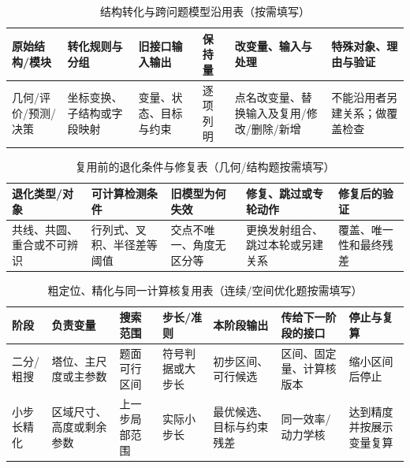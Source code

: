 \documentclass[withoutpreface,bwprint]{cumcmthesis}
\begin{document}
  \begin{table}[H]
    \centering
    \small
    \caption{结构转化与跨问题模型沿用表（按需填写）}
    \label{tab:model-inheritance-guide}
    \begin{tabular}{p{1.85cm}p{2.25cm}p{2.05cm}p{1.75cm}p{2.25cm}p{2.7cm}}
      \toprule
      原始结构/模块 & 转化规则与分组 & 旧接口输入输出 & 保持量 & 改变量、输入与处理 & 特殊对象、理由与验证 \\
      \midrule
      几何/评价/预测/决策 & 坐标变换、子结构或字段映射 & 变量、状态、目标与约束 & 逐项列明 & 点名改变量、替换输入及复用/修改/删除/新增 & 不能沿用者另建关系；做覆盖检查 \\
      \bottomrule
    \end{tabular}
  \end{table}
  \begin{table}[H]
    \centering
    \small
    \caption{复用前的退化条件与修复表（几何/结构题按需填写）}
    \label{tab:degeneracy-repair-guide}
    \begin{tabular}{p{2.0cm}p{2.5cm}p{2.8cm}p{2.75cm}p{2.7cm}}
      \toprule
      退化类型/对象 & 可计算检测条件 & 旧模型为何失效 & 修复、跳过或专轮动作 & 修复后的验证 \\
      \midrule
      共线、共圆、重合或不可辨识 & 行列式、叉积、半径差等阈值 & 交点不唯一、角度无区分等 & 更换发射组合、跳过本轮或另建关系 & 覆盖、唯一性和最终残差 \\
      \bottomrule
    \end{tabular}
  \end{table}
  \begin{table}[H]
    \centering
    \small
    \caption{粗定位、精化与同一计算核复用表（连续/空间优化题按需填写）}
    \label{tab:coarse-fine-search-guide}
    \begin{tabular}{p{1.55cm}p{2.0cm}p{2.1cm}p{1.55cm}p{2.0cm}p{2.0cm}p{1.75cm}}
      \toprule
      阶段 & 负责变量 & 搜索范围 & 步长/准则 & 本阶段输出 & 传给下一阶段的接口 & 停止与复算 \\
      \midrule
      二分/粗搜 & 塔位、主尺度或主参数 & 题面可行区间 & 符号判据或大步长 & 初步区间、可行候选 & 区间、固定量、计算核版本 & 缩小区间后停止 \\
      小步长精化 & 区域尺寸、高度或剩余参数 & 上一步局部范围 & 实际小步长 & 最优候选、目标与约束残差 & 同一效率/动力学核 & 达到精度并按展示变量复算 \\
      \bottomrule
    \end{tabular}
  \end{table}
\fi
\end{document}
